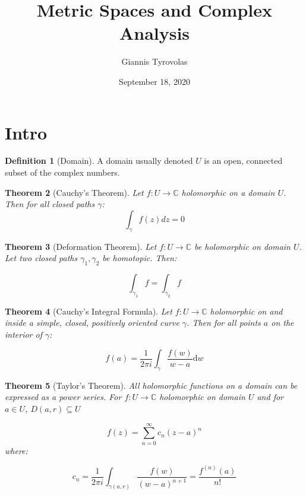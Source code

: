 \documentclass[11pt,a4paper, titlepage]{article}
\title{Metric Spaces and Complex Analysis}
\author{Giannis Tyrovolas}
\date{September 18, 2020}
\newtheorem{theorem}{Theorem}[section]
\theoremstyle{definition}
\newtheorem{definition}[theorem]{Definition}
\begin{document}
\maketitle

\section{Intro}

\begin{definition}[Domain]
A domain usually denoted $U$ is an open, connected subset of the complex numbers.
\end{definition}

\begin{theorem}[Cauchy's Theorem]

Let $ f \colon U \longrightarrow \mathbb{C}$ holomorphic on a domain $U$. Then for all closed paths $\gamma$:
\[
	\int_\gamma f(z) dz = 0
\]

\end{theorem}

\begin{theorem}[Deformation Theorem]

Let $f \colon U \longrightarrow \mathbb{C}$ be holomorphic on domain $U$. Let two closed paths $\gamma_1, \gamma_2 $ be homotopic. Then:

\[
	\int_{\gamma_1} f = \int_{\gamma_2} f
\]	

\end{theorem}

\begin{theorem}[Cauchy's Integral Formula]

Let $f \colon U \longrightarrow \mathbb{C}$ holomorphic on and inside a simple, closed, positively oriented curve $\gamma$. Then for all points $a$ on the interior of $\gamma$:

\[
	f(a) = \frac{1}{2\pi i} \int_\gamma \frac{f(w)}{w-a} \mathrm{d}w
\]	

\end{theorem}

\begin{theorem}[Taylor's Theorem]

All holomorphic functions on a domain can be expressed as a power series. For $f \colon U \longrightarrow \mathbb{C}$ holomorphic on domain $U$ and for $a \in U$, $D(a,r) \subseteq U$

\[
	f(z) = 	\sum_{n=0}^\infty c_n (z-a)^n
\]
where:

\[
	c_n = \frac{1}{2 \pi i} \int_{\gamma(a,r)} \frac{f(w)}{(w-a)^{n+1}} = \frac{f^{(n)}(a)}{n!}
\]
\end{theorem}
\end{document}
